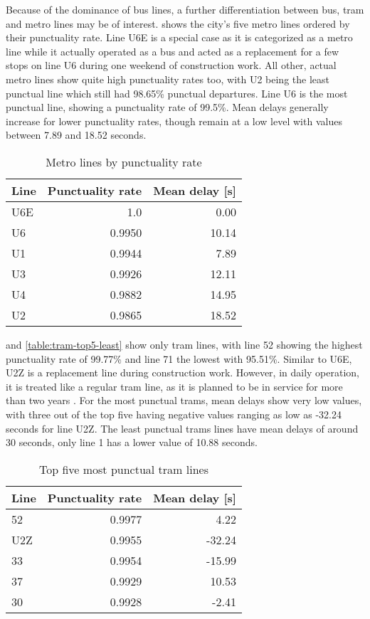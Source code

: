 Because of the dominance of bus lines, a further differentiation between bus, tram and metro lines may be of interest.  shows the city's five metro lines ordered by their punctuality rate. Line U6E is a special case as it is categorized as a metro line while it actually operated as a bus and acted as a replacement for a few stops on line U6 during one weekend of construction work. All other, actual metro lines show quite high punctuality rates too, with U2 being the least punctual line which still had 98.65\% punctual departures. Line U6 is the most punctual line, showing a punctuality rate of 99.5\%. Mean delays generally increase for lower punctuality rates, though remain at a low level with values between 7.89 and 18.52 seconds.

\begin{table}
	\centering
	\begin{tabular}{lrr}
		\toprule
		Line & Punctuality rate & Mean delay [s] \\
		\midrule
		U6E & 1.0 & 0.00 \\
		U6 &   0.9950 & 10.14 \\
		U1 &   0.9944 & 7.89 \\
		U3 &   0.9926 & 12.11 \\
		U4 &   0.9882 & 14.95 \\
		U2 &   0.9865 & 18.52 \\
		\bottomrule
	\end{tabular}
	\caption{Metro lines by punctuality rate}
	\label{table:metro-top5}
\end{table}

 and \cref{table:tram-top5-least} show only tram lines, with line 52 showing the highest punctuality rate of 99.77\% and line 71 the lowest with 95.51\%. Similar to U6E, U2Z is a replacement line during construction work. However, in daily operation, it is treated like a regular tram line, as it is planned to be in service for more than two years \autocite{stadt-wien-2021}. For the most punctual trams, mean delays show very low values, with three out of the top five having negative values ranging as low as -32.24 seconds for line U2Z. The least punctual trams lines have mean delays of around 30 seconds, only line 1 has a lower value of 10.88 seconds.


\begin{table}
	\centering
	\begin{tabular}{lrr}
		\toprule
		Line & Punctuality rate & Mean delay [s] \\
		\midrule
		52 &  0.9977 & 4.22 \\
		U2Z &  0.9955 & -32.24 \\
		33 &   0.9954 & -15.99 \\
		37 &   0.9929 & 10.53 \\
		30 &   0.9928 & -2.41 \\
		\bottomrule
	\end{tabular}
	\caption{Top five most punctual tram lines}
	\label{table:tram-top5-most}
\end{table}

